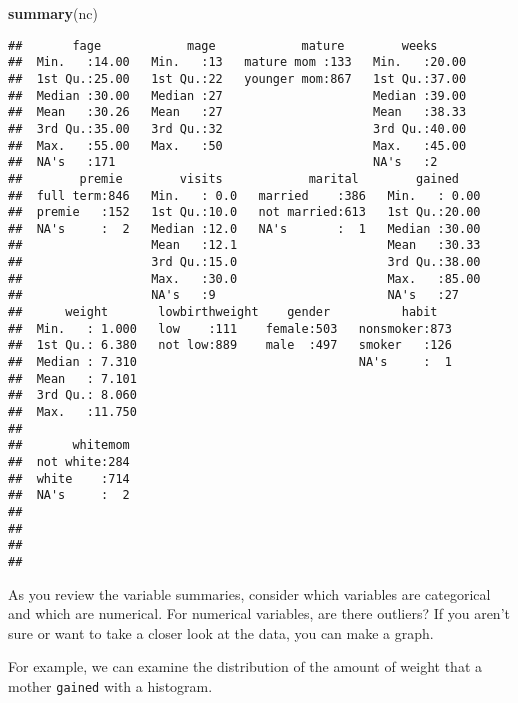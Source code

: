\documentclass[]{article}
\newenvironment{Shaded}{\begin{snugshade}}{\end{snugshade}}
\newcommand{\KeywordTok}[1]{\textcolor[rgb]{0.13,0.29,0.53}{\textbf{#1}}}
\newcommand{\NormalTok}[1]{#1}
\begin{document}
\begin{Shaded}
\begin{Highlighting}[]
\KeywordTok{summary}\NormalTok{(nc)}
\end{Highlighting}
\end{Shaded}

\begin{verbatim}
##       fage            mage            mature        weeks      
##  Min.   :14.00   Min.   :13   mature mom :133   Min.   :20.00  
##  1st Qu.:25.00   1st Qu.:22   younger mom:867   1st Qu.:37.00  
##  Median :30.00   Median :27                     Median :39.00  
##  Mean   :30.26   Mean   :27                     Mean   :38.33  
##  3rd Qu.:35.00   3rd Qu.:32                     3rd Qu.:40.00  
##  Max.   :55.00   Max.   :50                     Max.   :45.00  
##  NA's   :171                                    NA's   :2      
##        premie        visits            marital        gained     
##  full term:846   Min.   : 0.0   married    :386   Min.   : 0.00  
##  premie   :152   1st Qu.:10.0   not married:613   1st Qu.:20.00  
##  NA's     :  2   Median :12.0   NA's       :  1   Median :30.00  
##                  Mean   :12.1                     Mean   :30.33  
##                  3rd Qu.:15.0                     3rd Qu.:38.00  
##                  Max.   :30.0                     Max.   :85.00  
##                  NA's   :9                        NA's   :27     
##      weight       lowbirthweight    gender          habit    
##  Min.   : 1.000   low    :111    female:503   nonsmoker:873  
##  1st Qu.: 6.380   not low:889    male  :497   smoker   :126  
##  Median : 7.310                               NA's     :  1  
##  Mean   : 7.101                                              
##  3rd Qu.: 8.060                                              
##  Max.   :11.750                                              
##                                                              
##       whitemom  
##  not white:284  
##  white    :714  
##  NA's     :  2  
##                 
##                 
##                 
## 
\end{verbatim}

As you review the variable summaries, consider which variables are
categorical and which are numerical. For numerical variables, are there
outliers? If you aren't sure or want to take a closer look at the data,
you can make a graph.

For example, we can examine the distribution of the amount of weight
that a mother \texttt{gained} with a histogram.
\end{document}
